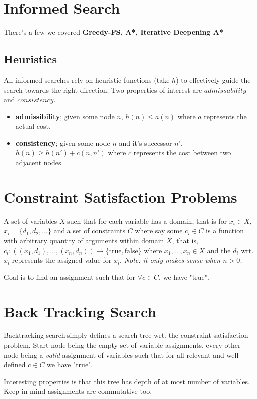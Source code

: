 \documentclass{article}
\begin{document}
\section{Informed Search}
There's a few we covered \textbf{Greedy-FS, A*, Iterative Deepening A*}

\subsection{Heuristics}
All informed searches rely on heuristic functions (take $h$) to effectively guide the search towards the right direction. Two properties of interest are $admissability$ and $consistency$.

\begin{itemize}
	\item \textbf{admissibility}; given some node $n$, $h(n) \leq a(n)$ where $a$ represents the actual cost.
	\item \textbf{consistency}; given some node $n$ and it's successor $n'$, $h(n) \geq h(n') + c(n, n')$ where $c$ represents the cost between two adjacent nodes.
\end{itemize}

\section{Constraint Satisfaction Problems}
A set of variables $X$ such that for each variable has a domain, that is for $x_i \in X$, $x_i = \{d_1, d_2, ...\}$ and a set of constraints $C$ where say some $c_i \in C$ is a function with arbitrary quantity of arguments within domain $X$, that is, $c_i: ((x_1, d_1), ..., (x_n,d_n)) \rightarrow \{\text{true}, \text{false}\}$ where $x_1, ..., x_n \in X$ and the $d_i$ wrt. $x_i$ represents the assigned value for $x_i$. \emph{Note: it only makes sense when $n > 0$.}

Goal is to find an assignment such that for $\forall c \in C$, we have "true".

\section{Back Tracking Search}
Backtracking search simply defines a search tree wrt. the constraint satisfaction problem. Start node being the empty set of variable assignments, every other node being a \emph{valid} assignment of variables such that for all relevant and well defined $c \in C$ we have "true".

Interesting properties is that this tree has depth of at most number of variables. Keep in mind assignments are commutative too.
\end{document}
